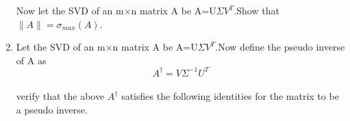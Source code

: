 \documentclass[journal,12pt,onecolumn]{IEEEtran}
\begin{document}
\begin{enumerate}
Now let the SVD of an m$\times$n matrix A be A=U$\Sigma{V^T}.$Show that $\|A\|=\sigma_{max}(A)$.
\item Let the SVD of an m$\times$n matrix A be A=U$\Sigma{V^T}.$Now define the pseudo inverse of A as
$$A^\dagger=V\Sigma^{-1}U^{T}$$\\
verify that the above $A^\dagger$ satisfies the following identities for the matrix to be a pseudo inverse.\\
\begin{enumerate}[(i)]
\end{enumerate}

\end{enumerate}
\end{document}

